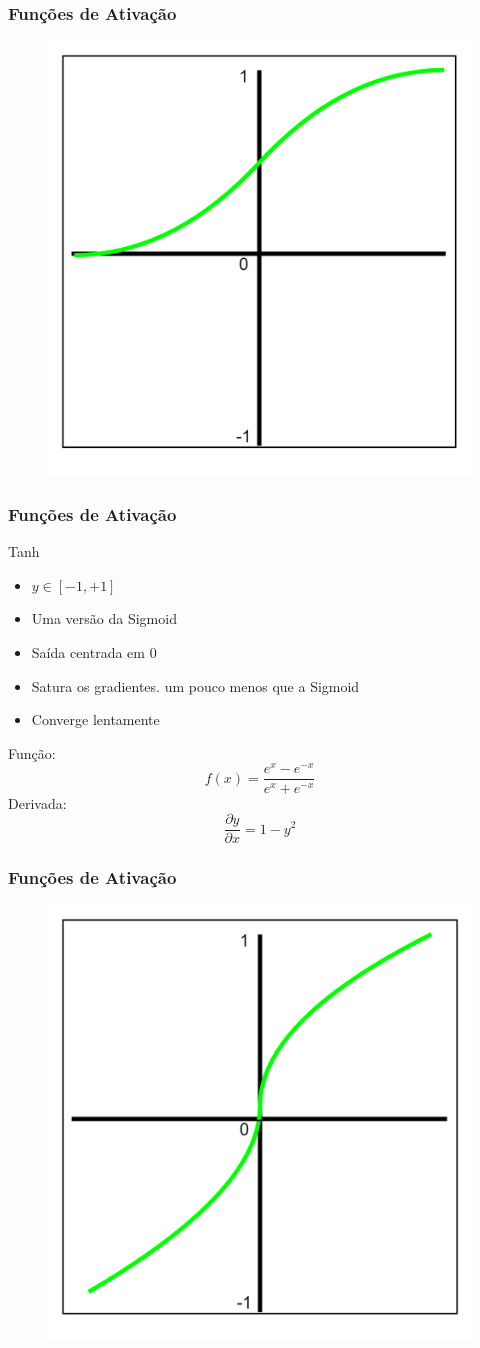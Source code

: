 \documentclass{beamer}
\begin{document}
\begin{frame}
	\frametitle{Funções de Ativação}
\begin{figure}
	\centering
	\includegraphics[width=0.4\linewidth]{figures/sigmoid_function.png}
\end{figure}
\end{frame}
\begin{frame}
	\frametitle{Funções de Ativação}
	\begin{block}{Tanh}
		\begin{itemize}
			\item $y \in [-1, + 1]$
			\item Uma versão da Sigmoid
			\item Saída centrada em $0$
			\item Satura os gradientes. um pouco menos que a Sigmoid
			\item Converge lentamente
		\end{itemize}
		Função:
		$$f(x) = \frac{e^x - e^{-x}}{e^x+e^{-x}}$$
		Derivada: 	$$\frac{\partial y}{\partial x} = 1 - y^2$$
	\end{block}
\end{frame}
\begin{frame}
	\frametitle{Funções de Ativação}
\begin{figure}
	\centering
	\includegraphics[width=0.4\linewidth]{figures/tanh_function}
\end{figure}
\end{frame}
\end{document}
